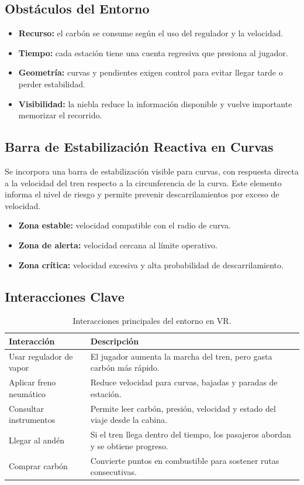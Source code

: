 ﻿\documentclass[11pt,letterpaper]{article}
\begin{document}
\subsection{Obstáculos del Entorno}

\begin{itemize}
  \item \textbf{Recurso:} el carbón se consume según el uso del regulador y la velocidad.
  \item \textbf{Tiempo:} cada estación tiene una cuenta regresiva que presiona al jugador.
  \item \textbf{Geometría:} curvas y pendientes exigen control para evitar llegar tarde o perder estabilidad.
  \item \textbf{Visibilidad:} la niebla reduce la información disponible y vuelve importante memorizar el recorrido.
\end{itemize}

\subsection{Barra de Estabilización Reactiva en Curvas}

Se incorpora una barra de estabilización visible para curvas, con respuesta directa a la velocidad del tren respecto a la circunferencia de la curva. Este elemento informa el nivel de riesgo y permite prevenir descarrilamientos por exceso de velocidad.

\begin{itemize}
  \item \textbf{Zona estable:} velocidad compatible con el radio de curva.
  \item \textbf{Zona de alerta:} velocidad cercana al límite operativo.
  \item \textbf{Zona crítica:} velocidad excesiva y alta probabilidad de descarrilamiento.
\end{itemize}

\subsection{Interacciones Clave}

\begin{table}[H]
\centering
\begin{tabularx}{\textwidth}{@{}L{4.2cm}Y@{}}
\toprule
\textbf{Interacción} & \textbf{Descripción}\\
\midrule
Usar regulador de vapor & El jugador aumenta la marcha del tren, pero gasta carbón más rápido.\\
Aplicar freno neumático & Reduce velocidad para curvas, bajadas y paradas de estación.\\
Consultar instrumentos & Permite leer carbón, presión, velocidad y estado del viaje desde la cabina.\\
Llegar al andén & Si el tren llega dentro del tiempo, los pasajeros abordan y se obtiene progreso.\\
Comprar carbón & Convierte puntos en combustible para sostener rutas consecutivas.\\
\bottomrule
\end{tabularx}
\caption{Interacciones principales del entorno en VR.}
\end{table}
\end{document}

